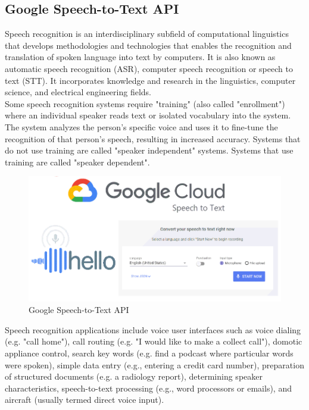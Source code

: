 \documentclass[14pt]{report}
\begin{document}
			\subsection{Google Speech-to-Text API}
				Speech recognition is an interdisciplinary subfield of computational linguistics that develops methodologies and technologies that enables the recognition and translation of spoken language into text by computers. It is also known as automatic speech recognition (ASR), computer speech recognition or speech to text (STT). It incorporates knowledge and research in the linguistics, computer science, and electrical engineering fields.\\

				Some speech recognition systems require "training" (also called "enrollment") where an individual speaker reads text or isolated vocabulary into the system. The system analyzes the person's specific voice and uses it to fine-tune the recognition of that person's speech, resulting in increased accuracy. Systems that do not use training are called "speaker independent" systems. Systems that use training are called "speaker dependent".\\
				\begin{figure}[h]
					\includegraphics[width=14cm]{googlestt.png}
					\centering
					\caption{Google Speech-to-Text API}
				\end{figure}

				Speech recognition applications include voice user interfaces such as voice dialing (e.g. "call home"), call routing (e.g. "I would like to make a collect call"), domotic appliance control, search key words (e.g. find a podcast where particular words were spoken), simple data entry (e.g., entering a credit card number), preparation of structured documents (e.g. a radiology report), determining speaker characteristics, speech-to-text processing (e.g., word processors or emails), and aircraft (usually termed direct voice input).\\
\end{document}
